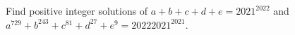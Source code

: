 Find positive integer solutions of $a+b+c+d+e=2021^{2022}$ and $a^{729}+b^{243}+c^{81}+d^{27}+e^9=20222021^{2021}$.
